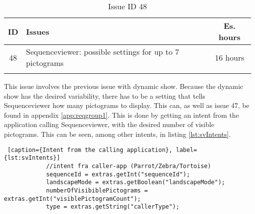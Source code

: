 \begin{longtable} { | c | p{12cm} | c | } 
\hline
	ID 	&	Issues	&		 Es. hours \\\hline
	 48	&	Sequenceviewer: possible settings for up to 7 pictograms	&	16 hours \\\hline
\caption{Issue ID 48}
\label{tab:spr3_SVsettingsupto7pictograms}
\end{longtable}

This issue involves the previous issue with dynamic show. Because the dynamic show has the desired variability, there has to be a setting that tells Sequenceviewer how many pictograms to display. This can, as well as issue 47, be found in appendix \ref{app:reqgroup1}. This is done by getting an intent from the application calling Sequenceviewer, with the desired number of visible pictograms. This can be seen, among other intents, in listing \ref{lst:svIntents}.

\begin{lstlisting} [caption={Intent from the calling application}, label={lst:svIntents}]
            //intent fra caller-app (Parrot/Zebra/Tortoise)
            sequenceId = extras.getInt("sequenceId");
            landscapeMode = extras.getBoolean("landscapeMode");
            numberOfVisibiblePictograms = extras.getInt("visiblePictogramCount");
            type = extras.getString("callerType");
\end{lstlisting}